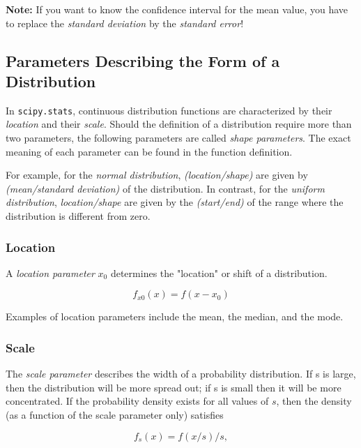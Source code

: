 \textbf{Note:} If you want to know the confidence interval for the mean value, you have to replace the \emph{standard deviation} by the \emph{standard error}!

\subsection{Parameters Describing the Form of a Distribution}

In \lstinline{scipy.stats}, continuous distribution functions are characterized by their \emph{location} and their \emph{scale}. Should the definition of a distribution require more than two parameters, the following parameters are called \emph{shape parameters}.  The exact meaning of each parameter can be found in the function definition.

For example, for the \emph{normal distribution}, \emph{(location/shape)} are given by \emph{(mean/standard deviation)} of the distribution. In contrast, for the \emph{uniform distribution}, \emph{location/shape} are given by the \emph{(start/end)} of the range where the distribution is different from zero.

\subsubsection{Location}

A \emph{location parameter} $x_0$  determines the "location" or shift of a distribution.

\begin{equation*}
  f_{x0}(x)=f(x-x_0)
\end{equation*}

Examples of location parameters include the mean, the median, and the mode.

\subsubsection{Scale}

The \emph{scale parameter} describes the width of a probability distribution.  If s is large, then the distribution will be more spread out; if s is small then it will be more concentrated. If the probability density exists for all values of $s$, then the density (as a function of the scale parameter only) satisfies

\begin{equation*}
   f_s(x) = f(x/s)/s,
\end{equation*}

